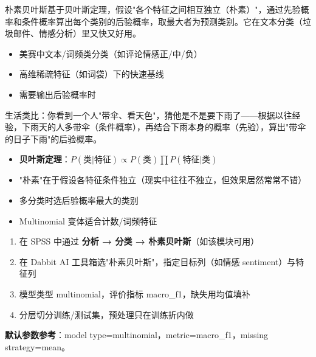 
\begin{algointro}
朴素贝叶斯基于贝叶斯定理，假设"各个特征之间相互独立（朴素）"，通过先验概率和条件概率算出每个类别的后验概率，取最大者为预测类别。它在文本分类（垃圾邮件、情感分析）里又快又好用。
\end{algointro}

\begin{algoscene}
\begin{itemize}
    \item 美赛中文本/词频类分类（如评论情感正/中/负）
    \item 高维稀疏特征（如词袋）下的快速基线
    \item 需要输出后验概率时
\end{itemize}
\end{algoscene}

\begin{algoprinciple}
生活类比：你看到一个人"带伞、看天色"，猜他是不是要下雨了——根据以往经验，下雨天的人多带伞（条件概率），再结合下雨本身的概率（先验），算出"带伞的日子下雨"的后验概率。

\begin{itemize}
    \item \textbf{贝叶斯定理}：$P(\text{类}|\text{特征}) \propto P(\text{类}) \prod P(\text{特征}|\text{类})$
    \item "朴素"在于假设各特征条件独立（现实中往往不独立，但效果居然常常不错）
    \item 多分类时选后验概率最大的类别
    \item Multinomial 变体适合计数/词频特征
\end{itemize}
\end{algoprinciple}

\begin{algosposs}
\begin{enumerate}
    \item 在 SPSS 中通过 \textbf{分析 → 分类 → 朴素贝叶斯}（如该模块可用）
    \item 在 Dabbit AI 工具箱选"朴素贝叶斯"，指定目标列（如情感 sentiment）与特征列
    \item 模型类型 multinomial，评价指标 macro\_f1，缺失用均值填补
    \item 分层切分训练/测试集，预处理只在训练折内做
\end{enumerate}

\textbf{默认参数参考}：model type=multinomial，metric=macro\_f1，missing strategy=mean。
\end{algosposs}

